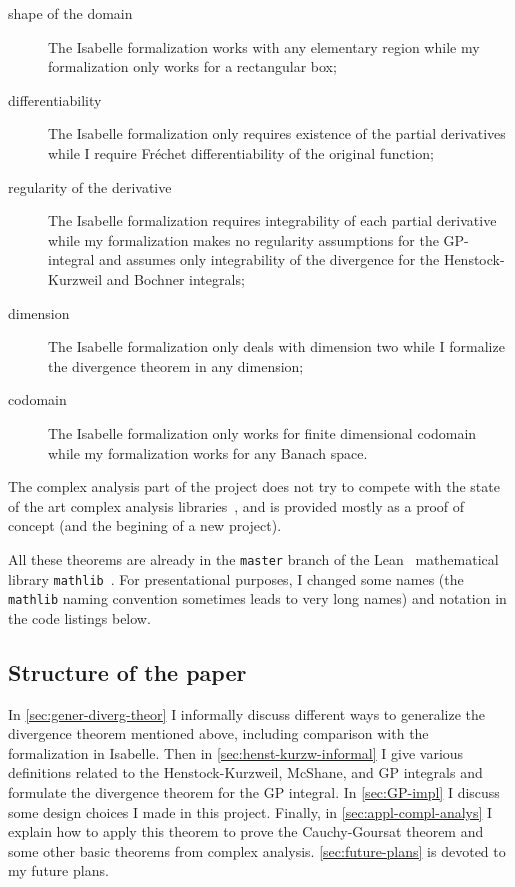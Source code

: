 \documentclass[a4paper,UKenglish,cleveref, autoref, thm-restate]{lipics-v2021}
\begin{document}
\begin{description}
\item[shape of the domain] The Isabelle formalization works with any
  elementary region while my formalization only works for a
  rectangular box;
\item[differentiability] The Isabelle formalization only requires
  existence of the partial derivatives while I require Fréchet
  differentiability of the original function;
\item[regularity of the derivative] The Isabelle formalization requires
  integrability of each partial derivative while my formalization
  makes no regularity assumptions for the GP-integral and assumes only
  integrability of the divergence for the Henstock-Kurzweil and
  Bochner integrals;
\item[dimension] The Isabelle formalization only deals with dimension two
  while I formalize the divergence theorem in any dimension;
\item[codomain] The Isabelle formalization only works for finite
  dimensional codomain while my formalization works for any Banach
  space.
\end{description}

The complex analysis part of the project does not try to compete with
the state of the art complex analysis
libraries~\cite{harrison-mizar,harrison-hol}, and is
provided mostly as a proof of concept (and the begining of a new
project).

All these theorems are already in the \texttt{master} branch of the
Lean~\cite{10.1007/978-3-319-21401-6_26} mathematical library
\texttt{mathlib}~\cite{mathlib20}. For presentational purposes, I
changed some names (the \texttt{mathlib} naming convention sometimes
leads to very long names) and notation in the code listings below.

\subsection{Structure of the paper}%
\label{sec:structure-paper}

In \autoref{sec:gener-diverg-theor} I informally discuss different
ways to generalize the divergence theorem mentioned above, including
comparison with the formalization in Isabelle. Then in
\autoref{sec:henst-kurzw-informal} I give various definitions related
to the Henstock-Kurzweil, McShane, and GP integrals and formulate the
divergence theorem for the GP integral. In \autoref{sec:GP-impl} I
discuss some design choices I made in this project. Finally, in
\autoref{sec:appl-compl-analys} I explain how to apply this theorem to
prove the Cauchy-Goursat theorem and some other basic theorems from
complex analysis. \autoref{sec:future-plans} is devoted to my future
plans.
\end{document}

